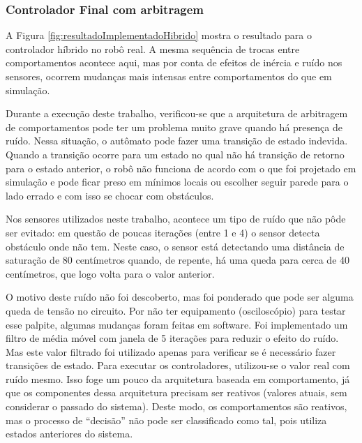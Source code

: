 	
	
	\subsubsection{Controlador Final com arbitragem}

	A Figura \ref{fig:resultadoImplementadoHibrido} mostra o resultado para o controlador híbrido no robô real.
	A mesma sequência de trocas entre comportamentos acontece aqui, mas por conta de efeitos de inércia e ruído
	nos sensores, ocorrem mudanças mais intensas entre comportamentos do que em simulação.
	
	
	
	Durante a execução deste trabalho, verificou-se que a arquitetura de arbitragem de comportamentos pode ter 
	um problema muito grave quando há presença de ruído. Nessa situação, o autômato pode fazer uma transição de 
	estado indevida. Quando a transição ocorre para um estado no qual não há transição de retorno para o estado
	anterior, o robô não funciona de acordo com o que foi projetado em simulação e pode ficar preso em mínimos 
	locais ou escolher seguir parede para o lado errado e com isso se chocar com obstáculos.
	
	Nos sensores utilizados neste trabalho, acontece um tipo de ruído que não pôde ser evitado: em questão de 
	poucas iterações (entre 1 e 4) o sensor detecta obstáculo onde não tem. Neste caso, o sensor está detectando
	uma distância de saturação de 80 centímetros quando, de repente, há uma queda para cerca de 40 centímetros, que
	logo volta para o valor anterior. 
	
	O motivo deste ruído não foi descoberto, mas foi ponderado que pode ser alguma queda de tensão no circuito. 
	Por não ter equipamento (osciloscópio) para testar esse palpite, algumas mudanças foram feitas em software. 
	Foi implementado um filtro de média móvel com janela de 5 iterações para reduzir o efeito do ruído. Mas este
	valor filtrado foi utilizado apenas para verificar se é necessário fazer transições de estado. Para executar
	os controladores, utilizou-se o valor real com ruído mesmo. Isso foge um pouco da arquitetura baseada em 
	comportamento, já que os componentes dessa arquitetura precisam ser reativos (valores atuais, sem considerar 
	o passado do sistema). Deste modo, os comportamentos são reativos, mas o processo de ``decisão'' 
	não pode ser classificado como tal, pois utiliza estados anteriores do sistema.
	
